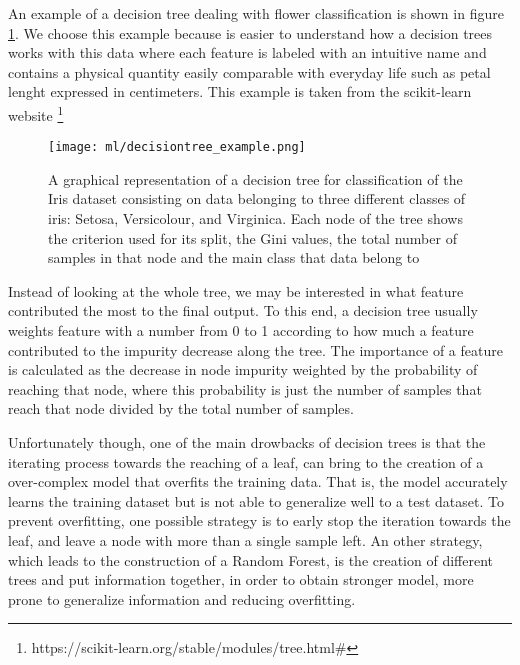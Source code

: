 \documentclass[11pt]{report}
\begin{document}
An example of a decision tree dealing with flower classification is shown in figure \ref{fig:decisiontree}.
We choose this example because is easier to understand how a decision trees works with this data where each feature is labeled with an intuitive name and contains a physical quantity easily comparable with everyday life such as petal lenght expressed in centimeters.
This example is taken from the scikit-learn website \footnote{https://scikit-learn.org/stable/modules/tree.html\#}

\begin{figure}
\centering
\texttt{[image: ml/decisiontree\_example.png]}
\caption{A graphical representation of a decision tree for classification of the Iris dataset consisting on data belonging to three different classes of iris: Setosa, Versicolour, and Virginica. Each node of the tree shows the criterion used for its split, the Gini values, the total number of samples in that node and the main class that data belong to}
\label{fig:decisiontree}
\end{figure}

Instead of looking at the whole tree, we may be interested in what feature contributed the most to the final output.
To this end, a decision tree usually weights feature with a number from 0 to 1 according to how much a feature contributed to the impurity decrease along the tree.
The importance of a feature is calculated as the decrease in node impurity weighted by the probability of reaching that node, where this probability is just the number of samples that reach that node divided by the total number of samples.
\cite{raschka-2019} \cite{muller-2017}

Unfortunately though, one of the main drowbacks of decision trees is that the iterating process towards the reaching of a leaf, can bring to the creation of a over-complex model that overfits the training data.
That is, the model accurately learns the training dataset but is not able to generalize well to a test dataset.
To prevent overfitting, one possible strategy is to early stop the iteration towards the leaf, and leave a node with more than a single sample left.
An other strategy, which leads to the construction of a Random Forest, is the creation of different trees and put information together, in order to obtain stronger model, more prone to generalize information and reducing overfitting.
\end{document}
